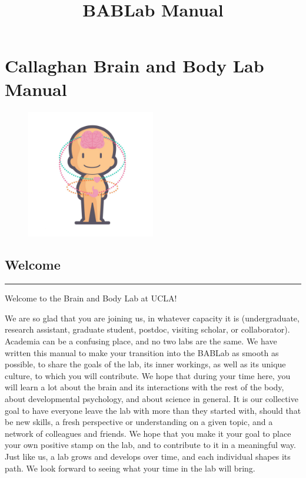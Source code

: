 \documentclass[]{book}
\title{BABLab Manual}
\author{}
\date{\vspace{-2.5em}}
\begin{document}
\maketitle

{
\setcounter{tocdepth}{1}
\tableofcontents
}
\hypertarget{callaghan-brain-and-body-lab-manual}{%
\chapter{Callaghan Brain and Body Lab Manual}\label{callaghan-brain-and-body-lab-manual}}

\begin{figure}
\centering
\includegraphics[width=0.5\textwidth,height=0.5\textheight]{images/index/Icon.jpg}
\caption{}
\end{figure}

\hypertarget{welcome}{%
\section{Welcome}\label{welcome}}

\begin{center}\rule{0.5\linewidth}{0.5pt}\end{center}

Welcome to the Brain and Body Lab at UCLA!

We are so glad that you are joining us, in whatever capacity it is (undergraduate, research assistant, graduate student, postdoc, visiting scholar, or collaborator). Academia can be a confusing place, and no two labs are the same. We have written this manual to make your transition into the BABLab as smooth as possible, to share the goals of the lab, its inner workings, as well as its unique culture, to which you will contribute. We hope that during your time here, you will learn a lot about the brain and its interactions with the rest of the body, about developmental psychology, and about science in general. It is our collective goal to have everyone leave the lab with more than they started with, should that be new skills, a fresh perspective or understanding on a given topic, and a network of colleagues and friends. We hope that you make it your goal to place your own positive stamp on the lab, and to contribute to it in a meaningful way. Just like us, a lab grows and develops over time, and each individual shapes its path. We look forward to seeing what your time in the lab will bring.
\end{document}
